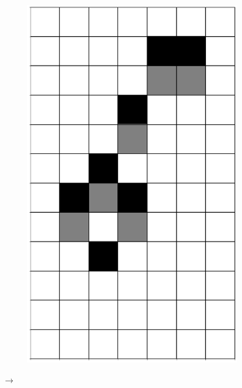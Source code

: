 \documentclass[12pt]{article}
\numberwithin{figure}{section} %
\begin{document}
\begin{figure}[H]
\begin{subfigure}{0.3\textwidth}
     		\includegraphics[angle=270,width=\linewidth]{Section4/10.2}
     		\subcaption{}
   	\end{subfigure}
      	{\LARGE$\xrightarrow{}$}
      	\newline
   	\setcounter{subfigure}{0}
   	\begin{subfigure}{0.3\textwidth}
     		\centering

\end{subfigure}
\end{figure}
\end{document}
